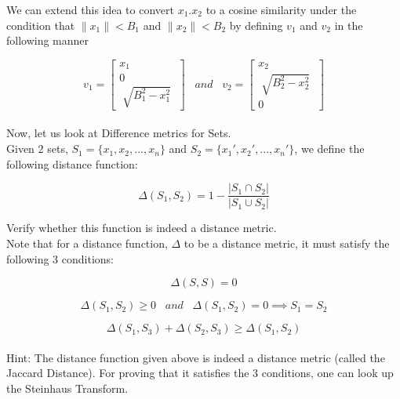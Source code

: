 \documentclass[11pt, twosides]{article}
\begin{document}
We can extend this idea to convert $x_1.x_2$ to a cosine similarity under the condition that $\|x_1\|<B_1$ and $\|x_2\|<B_2$ by defining $v_1$ and $v_2$ in the following manner

\begin{equation}
    v_1 = \begin{bmatrix}
         x_1  \\
         0 \\
        \;\sqrt{B_1^2-x_1^2}\;
    \end{bmatrix} 
    \;\;\; and \;\;\;
    v_2 = \begin{bmatrix}
         x_2  \\
        \;\sqrt{B_2^2-x_2^2}\; \\
        0
    \end{bmatrix} 
\end{equation}\\

Now, let us look at Difference metrics for Sets.\\

Given 2 sets, $S_1 = \{x_1, x_2, ..., x_n\}$ and $S_2 = \{x_1', x_2', ..., x_n'\}$, we define the following distance function:

\begin{equation}
    \Delta (S_1,S_2) = 1 - \frac{|S_1 \cap S_2|}{|S_1 \cup S_2|}
\end{equation}

Verify whether this function is indeed a distance metric.\\

Note that for a distance function, $\Delta$ to be a distance metric, it must satisfy the following 3 conditions:

\begin{equation}
    \Delta(S,S) = 0
\end{equation}

\begin{equation}
    \Delta(S_1,S_2) \geq 0 \;\;\; and \;\;\; \Delta(S_1,S_2) = 0 \implies S_1 = S_2
\end{equation}

\begin{equation}
    \Delta(S_1,S_3) + \Delta(S_2,S_3) \geq \Delta(S_1,S_2)
\end{equation}\\

Hint: The distance function given above is indeed a distance metric (called the Jaccard Distance). For proving that it satisfies the 3 conditions, one can look up the Steinhaus Transform.
\end{document}
